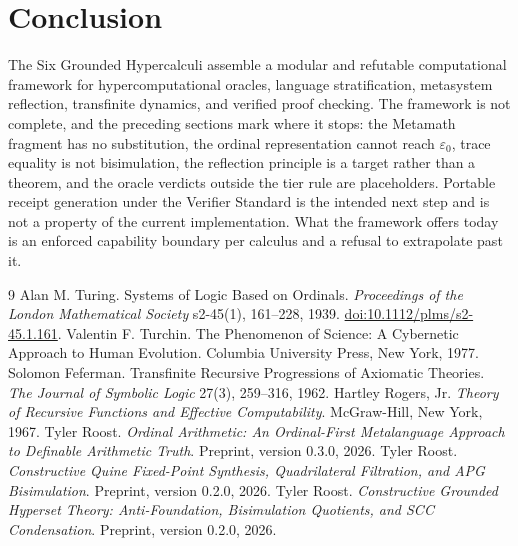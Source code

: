 \documentclass[11pt]{article}
\theoremstyle{definition}
\begin{document}
\section{Conclusion}
The Six Grounded Hypercalculi assemble a modular and refutable computational framework for hypercomputational oracles, language stratification, metasystem reflection, transfinite dynamics, and verified proof checking. The framework is not complete, and the preceding sections mark where it stops: the Metamath fragment has no substitution, the ordinal representation cannot reach $\varepsilon_0$, trace equality is not bisimulation, the reflection principle is a target rather than a theorem, and the oracle verdicts outside the tier rule are placeholders. Portable receipt generation under the Verifier Standard is the intended next step and is not a property of the current implementation. What the framework offers today is an enforced capability boundary per calculus and a refusal to extrapolate past it.

\begin{thebibliography}{9}
\small
{} Alan M. Turing. Systems of Logic Based on Ordinals. \emph{Proceedings of the London Mathematical Society} s2-45(1), 161--228, 1939. \href{https://doi.org/10.1112/plms/s2-45.1.161}{doi:10.1112/plms/s2-45.1.161}.
 Valentin F. Turchin. The Phenomenon of Science: A Cybernetic Approach to Human Evolution. Columbia University Press, New York, 1977.
 Solomon Feferman. Transfinite Recursive Progressions of Axiomatic Theories. \emph{The Journal of Symbolic Logic} 27(3), 259--316, 1962.
 Hartley Rogers, Jr. \emph{Theory of Recursive Functions and Effective Computability}. McGraw-Hill, New York, 1967.
 Tyler Roost. \emph{Ordinal Arithmetic: An Ordinal-First Metalanguage Approach to Definable Arithmetic Truth}. Preprint, version 0.3.0, 2026.
 Tyler Roost. \emph{Constructive Quine Fixed-Point Synthesis, Quadrilateral Filtration, and APG Bisimulation}. Preprint, version 0.2.0, 2026.
 Tyler Roost. \emph{Constructive Grounded Hyperset Theory: Anti-Foundation, Bisimulation Quotients, and SCC Condensation}. Preprint, version 0.2.0, 2026.
\end{thebibliography}
\end{document}
